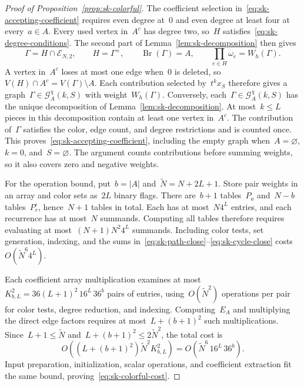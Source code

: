 \documentclass[letterpaper,11pt,reqno]{amsart}
\renewcommand{\leq}{\leqslant}
\DeclareMathOperator{\Br}{Br}
\begin{document}
\begin{proof}[Proof of Proposition~\ref{prop:sk-colorful}]
The coefficient selection in~\eqref{eq:sk-accepting-coefficient} requires even degree at~$0$ and even degree at least four at every~$a\in A$. Every used vertex in~$A^c$ has degree two, so~$H$ satisfies~\eqref{eq:sk-degree-conditions}. The second part of Lemma~\ref{lem:sk-decomposition} then gives
\begin{equation*}
\Gamma=H\cap\mathcal E_{N,2},\qquad H=\Gamma^+,\qquad
\Br(\Gamma)=A,\qquad \prod_{e\in H}\omega_e=W_h(\Gamma).
\end{equation*}
A vertex in~$A^c$ loses at most one edge when~$0$ is deleted, so~$V(H)\cap A^c=V(\Gamma)\setminus A$. Each contribution selected by~$t^kx_S$ therefore gives a graph~$\Gamma\in\mathcal G_A^\chi(k,S)$ with weight~$W_h(\Gamma)$. Conversely, each~$\Gamma\in\mathcal G_A^\chi(k,S)$ has the unique decomposition of Lemma~\ref{lem:sk-decomposition}. At most~$k\leq L$ pieces in this decomposition contain at least one vertex in~$A^c$. The contribution of~$\Gamma$ satisfies the color, edge count, and degree restrictions and is counted once. This proves~\eqref{eq:sk-accepting-coefficient}, including the empty graph when~$A=\varnothing$, $k=0$, and~$S=\varnothing$. The argument counts contributions before summing weights, so it also covers zero and negative weights.

For the operation bound, put~$b=|A|$ and~$\tilde N=N+2L+1$. Store pair weights in an array and color sets as~$2L$ binary flags. There are~$b+1$ tables~$P_a$ and~$N-b$ tables~$P_r^\circ$, hence~$N+1$ tables in total. Each has at most~$N4^L$ entries, and each recurrence has at most~$N$ summands. Computing all tables therefore requires evaluating at most~$(N+1)N^2 4^L$ summands. Including color tests, set generation, indexing, and the sums in~\eqref{eq:sk-path-close}--\eqref{eq:sk-cycle-close} costs~$O(\tilde N^6 4^L)$.

Each coefficient array multiplication examines at most
\(
K_{b,L}^2=36(L+1)^2\,16^L\,36^b
\)
pairs of entries, using~$O(\tilde N^2)$ operations per pair for color tests, degree reduction, and indexing. Computing~$E_A$ and multiplying the direct edge factors requires at most~$L+(b+1)^2$ such multiplications. Since~$L+1\leq\tilde N$ and~$L+(b+1)^2\leq2\tilde N^2$, the total cost is
\begin{equation*}
O\!\left((L+(b+1)^2)\tilde N^2 K_{b,L}^2\right)
=O\!\left(\tilde N^6\,16^L\,36^b\right).
\end{equation*}
Input preparation, initialization, scalar operations, and coefficient extraction fit the same bound, proving~\eqref{eq:sk-colorful-cost}.
\end{proof}
\end{document}
